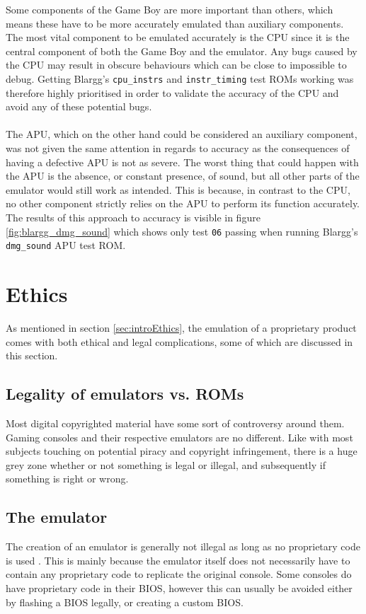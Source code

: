 Some components of the Game Boy are more important than others, which means these have to be more accurately emulated than auxiliary components. The most vital component to be emulated accurately is the CPU since it is the central component of both the Game Boy and the emulator. Any bugs caused by the CPU may result in obscure behaviours which can be close to impossible to debug. Getting Blargg's \texttt{cpu\_instrs} and \texttt{instr\_timing} \cite{Blargg} test ROMs working was therefore highly prioritised in order to validate the accuracy of the CPU and avoid any of these potential bugs.
\\\\
The APU, which on the other hand could be considered an auxiliary component, was not given the same attention in regards to accuracy as the consequences of having a defective APU is not as severe. The worst thing that could happen with the APU is the absence, or constant presence, of sound, but all other parts of the emulator would still work as intended. This is because, in contrast to the CPU, no other component strictly relies on the APU to perform its function accurately. The results of this approach to accuracy is visible in figure \ref{fig:blargg_dmg_sound} which shows only test \texttt{06} passing when running Blargg's \texttt{dmg\_sound} \cite{Blargg} APU test ROM.


\section{Ethics}
As mentioned in section \ref{sec:introEthics}, the emulation of a proprietary product comes with both ethical and legal complications, some of which are discussed in this section.
\label{sec:Ethics}
\subsection{Legality of emulators vs. ROMs}
Most digital copyrighted material have some sort of controversy around them. Gaming consoles and their respective emulators are no different. Like with most subjects touching on potential piracy and copyright infringement, there is a huge grey zone whether or not something is legal or illegal, and subsequently if something is right or wrong. 

\subsection{The emulator}
The creation of an emulator is generally not illegal as long as no proprietary code is used \cite{emulatorLegal}. This is mainly because the emulator itself does not necessarily have to contain any proprietary code to replicate the original console. Some consoles do have proprietary code in their BIOS, however this can usually be avoided either by flashing a BIOS legally, or creating a custom BIOS. 

